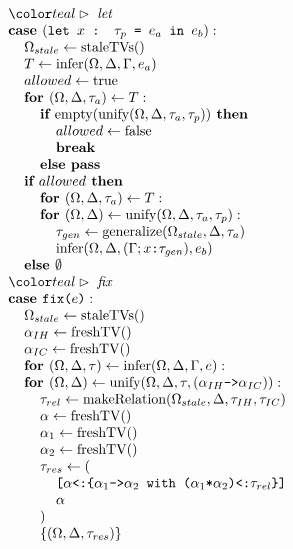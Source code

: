 \documentclass[acmsmall]{acmart}
\begin{document}
\begin{figure*}[h]
\[\begin{array}[t]{@{} l}
    \I \C{let}
    \\
    \I \B{case } (\code{let $x$ : $\tau_p$ = $e_a$ in $e_b$}) :  
    \\
    \I\I \Omega_{stale} \leftarrow \F{staleTVs}()
    \\
    \I\I T \leftarrow \F{infer}(\Omega, \Delta, \Gamma, e_a)
    \\
    \I\I allowed \leftarrow \F{true}
    \\
    \I\I \B{for } (\Omega, \Delta, \tau_a) \leftarrow T:
    \\
    \I\I\I \B{if } \F{empty}(\F{unify}(\Omega, \Delta, \tau_a, \tau_p)) \B{ then }
    \\
    \I\I\I\I allowed \leftarrow \F{false}
    \\
    \I\I\I\I \B{break}
    \\
    \I\I\I \B{else } \B{pass}
    \\
    \I\I \B{if } allowed \B{ then }
    \\
    \I\I\I \B{for } (\Omega, \Delta, \tau_a) \leftarrow T:
    \\
    \I\I\I \B{for } (\Omega, \Delta) \leftarrow \F{unify}(\Omega, \Delta, \tau_a, \tau_p):
    \\
    \I\I\I\I \tau_{gen} \leftarrow \F{generalize}(\Omega_{stale}, \Delta, \tau_a)
    \\
    \I\I\I\I \F{infer}(\Omega, \Delta, (\Gamma;\code{$x$:$\tau_{gen}$}), e_b)
    \\
    \I\I \B{else } \emptyset 

    \\

    \I \C{fix}
    \\
    \I \B{case } \code{fix($e$)} :  
    \\
    \I\I \Omega_{stale} \leftarrow \F{staleTVs}()
    \\
    \I\I \alpha_{IH} \leftarrow \F{freshTV}()
    \\
    \I\I \alpha_{IC} \leftarrow \F{freshTV}()
    \\
    \I\I \B{for } (\Omega, \Delta, \tau) \leftarrow \F{infer}(\Omega, \Delta, \Gamma, e):
    \\
    \I\I \B{for } (\Omega, \Delta) \leftarrow \F{unify}(\Omega, \Delta, \tau, (\code{$\alpha_{IH}$->$\alpha_{IC}$})): 
    \\
    \I\I\I \tau_{rel} \leftarrow \F{makeRelation}(\Omega_{stale}, \Delta, \tau_{IH}, \tau_{IC})
    \\
    \I\I\I \alpha \leftarrow \F{freshTV}()
    \\
    \I\I\I \alpha_1 \leftarrow \F{freshTV}()
    \\
    \I\I\I \alpha_2 \leftarrow \F{freshTV}()
    \\
    \I\I\I \tau_{res} \leftarrow (
    \\
    \I\I\I\I \code{[$\alpha$<:\{$\alpha_1$->$\alpha_2$ with ($\alpha_1$*$\alpha_2$)<:$\tau_{rel}$\}] }
    \\
    \I\I\I\I \alpha
    \\
    \I\I\I )
    \\
    \I\I\I \{(\Omega, \Delta, \tau_{res})\}


\end{array}\]
\end{figure*}
\end{document}
